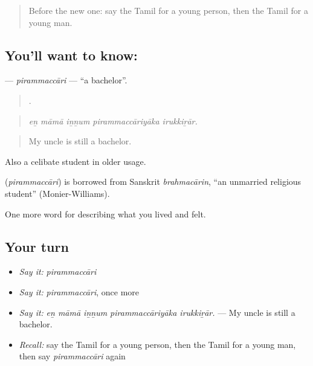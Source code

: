 \label{lesson:TA-C498-pirammaccari}



\begin{quote}
Before the new one: say the Tamil for a young person, then the Tamil for a young man.
\end{quote}

\subsection*{You'll want to know: }
\textbf{} — \emph{pirammaccāri} — \textquotedblleft{}a bachelor\textquotedblright{}.

\begin{quote}
    .
\end{quote}

\begin{quote}
\emph{eṉ māmā iṉṉum pirammaccāriyāka irukkiṟār.}
\end{quote}

\begin{quote}
My uncle is still a bachelor.
\end{quote}

Also a celibate student in older usage.

\begin{cousinweb}
\textbf{} (\emph{pirammaccāri}) is borrowed from Sanskrit \emph{brahmacārin}, \textquotedblleft{}an unmarried religious student\textquotedblright{} (Monier-Williams).
\end{cousinweb}

\begin{grammarlens}[title={What you've built}]
One more word for describing what you lived and felt.
\end{grammarlens}

\subsection*{Your turn}
\begin{itemize}
\raggedright
  \item \emph{Say it:} \emph{pirammaccāri}
  \item \emph{Say it:} \emph{pirammaccāri}, once more
  \item \emph{Say it:} \emph{eṉ māmā iṉṉum pirammaccāriyāka irukkiṟār.} — My uncle is still a bachelor.
  \item \emph{Recall:} say the Tamil for a young person, then the Tamil for a young man, then say \emph{pirammaccāri} again
\end{itemize}

